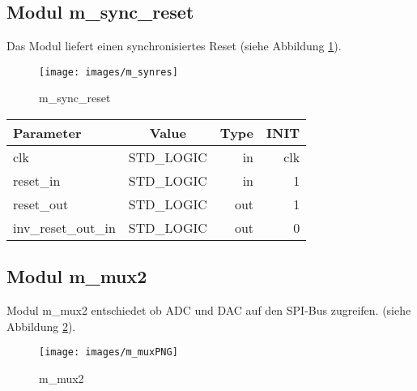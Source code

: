 \subsection{Modul m\_sync\_reset}
Das Modul liefert einen synchronisiertes Reset (siehe Abbildung \ref{fig:m_synres}).

\begin{figure}[h]
\centering
\texttt{[image: images/m\_synres]}
\caption{m\_sync\_reset}
\label{fig:m_synres}
\end{figure}

\begin{table}[h]
	\centering
	\begin{tabular}{|l|c|r|r|}
		\hline
		\rowcolor{green}Parameter & Value & Type & INIT\\
		\hline
		clk & STD\_LOGIC & in &clk\\
		\hline
		reset\_in & STD\_LOGIC & in & 1\\
		\hline
		reset\_out & STD\_LOGIC & out & 1 \\
		\hline
		inv\_reset\_out\_in & STD\_LOGIC & out & 0\\
		
		\hline
	\end{tabular}
\end{table}

\subsection{Modul m\_mux2}
Modul m\_mux2 entschiedet ob ADC und DAC auf den SPI-Bus zugreifen.  (siehe Abbildung \ref{fig:m_muxPNG}).

\begin{figure}[H]
\centering
\texttt{[image: images/m\_muxPNG]}
\caption{m\_mux2}
\label{fig:m_muxPNG}
\end{figure}

